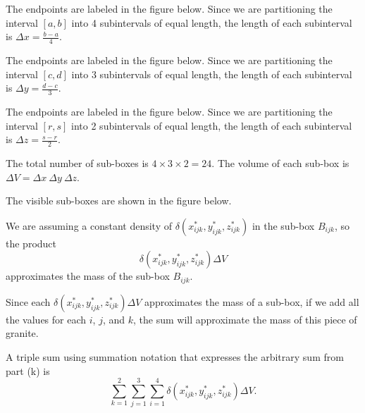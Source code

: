 \begin{activitySolution}
	\ba
	\item The endpoints are labeled in the figure below. Since we are partitioning the interval $[a,b]$ into 4 subintervals of equal length, the length of each subinterval is $\Delta x = \frac{b-a}{4}$. 	
		
	\item The endpoints are labeled in the figure below. Since we are partitioning the interval $[c,d]$ into 3 subintervals of equal length, the length of each subinterval is $\Delta y = \frac{d-c}{3}$. 	

	\item The endpoints are labeled in the figure below. Since we are partitioning the interval $[r,s]$ into 2 subintervals of equal length, the length of each subinterval is $\Delta z = \frac{s-r}{2}$.

	\item The total number of sub-boxes is $4 \times 3 \times 2 = 24$. The volume of each sub-box is $\Delta V = \Delta x \ \Delta y \ \Delta z$. 
		
	\item The visible sub-boxes are shown in the figure below. 
	
	\item We are assuming a constant density of $\delta(x_{ijk}^*, y_{ijk}^*, z_{ijk}^*)$ in the sub-box $B_{ijk}$, so the product 
\[\delta(x_{ijk}^*, y_{ijk}^*, z_{ijk}^*) \Delta V\]
approximates the mass of the sub-box $B_{ijk}$.

    \item Since each $\delta(x_{ijk}^*, y_{ijk}^*, z_{ijk}^*) \Delta V$ approximates the mass of a sub-box, if we add all the values for each $i$, $j$, and $k$, the sum will approximate the mass of this piece of granite.
	
	\item A triple sum using summation notation that expresses the arbitrary sum from part (k) is
\[\sum_{k=1}^2 \sum_{j=1}^3 \sum_{i=1}^4 \delta(x_{ijk}^*, y_{ijk}^*, z_{ijk}^*) \Delta V.\]
		
	
	\ea
\begin{center}
\end{center}
\end{activitySolution}
\aftera
